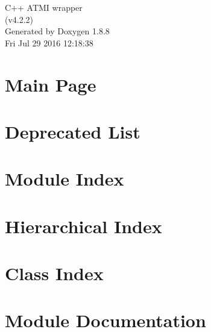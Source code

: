 \documentclass[twoside]{book}
\newcommand{\+}{\discretionary{\mbox{\scriptsize$\hookleftarrow$}}{}{}}
\newcommand{\clearemptydoublepage}{%
  \newpage{\pagestyle{empty}\cleardoublepage}%
}
\begin{document}
\hypersetup{pageanchor=false,
             bookmarks=true,
             bookmarksnumbered=true,
             pdfencoding=unicode
            }
\begin{titlepage}
\vspace*{7cm}
\begin{center}%
{\Large C++ A\+T\+M\+I wrapper \\[1ex]\large (v4.\+2.\+2) }\\
\vspace*{1cm}
{\large Generated by Doxygen 1.8.8}\\
\vspace*{0.5cm}
{\small Fri Jul 29 2016 12:18:38}\\
\end{center}
\end{titlepage}
\clearemptydoublepage
\tableofcontents
\clearemptydoublepage
{}
\hypersetup{pageanchor=true}

\chapter{Main Page}
\label{index}\hypertarget{index}{}
\chapter{Deprecated List}
\label{deprecated}
\hypertarget{deprecated}{}

\chapter{Module Index}

\chapter{Hierarchical Index}

\chapter{Class Index}

\chapter{Module Documentation}





\end{document}
